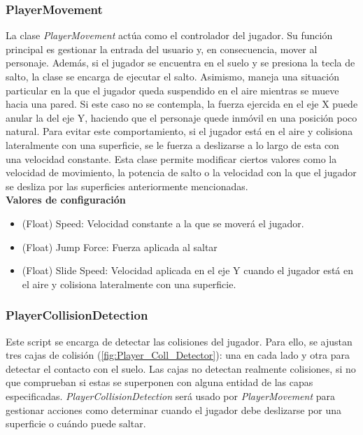 \subsubsection{PlayerMovement}

La clase \textit{PlayerMovement} actúa como el controlador del jugador. Su función principal es gestionar la entrada del usuario y, en consecuencia, mover al personaje. Además, si el jugador se encuentra en el suelo y se presiona la tecla de salto, la clase se encarga de ejecutar el salto.
Asimismo, maneja una situación particular en la que el jugador queda suspendido en el aire mientras se mueve hacia una pared. Si este caso no se contempla, la fuerza ejercida en el eje X puede anular la del eje Y, haciendo que el personaje quede inmóvil en una posición poco natural. Para evitar este comportamiento, si el jugador está en el aire y colisiona lateralmente con una superficie, se le fuerza a deslizarse a lo largo de esta con una velocidad constante.
Esta clase permite modificar ciertos valores como la velocidad de movimiento, la potencia de salto o la velocidad con la que el jugador se desliza por las superficies anteriormente mencionadas.\\

\textbf{Valores de configuración}
\begin{itemize}
	\item (Float) Speed: Velocidad constante a la que se moverá el jugador.
	\item (Float) Jump Force: Fuerza aplicada al saltar
	\item (Float) Slide Speed: Velocidad aplicada en el eje Y cuando el jugador está en el aire y colisiona lateralmente con una superficie.
\end{itemize}

\subsubsection{PlayerCollisionDetection}

Este script se encarga de detectar las colisiones del jugador. Para ello, se ajustan tres cajas de colisión (\autoref{fig:Player_Coll_Detector}): una en cada lado y otra para detectar el contacto con el suelo. Las cajas no detectan realmente colisiones, si no que comprueban si estas se superponen con alguna entidad de las capas especificadas.
\textit{PlayerCollisionDetection} será usado por \textit{PlayerMovement} para gestionar acciones como determinar cuando el jugador debe deslizarse por una superficie o cuándo puede saltar.\\

